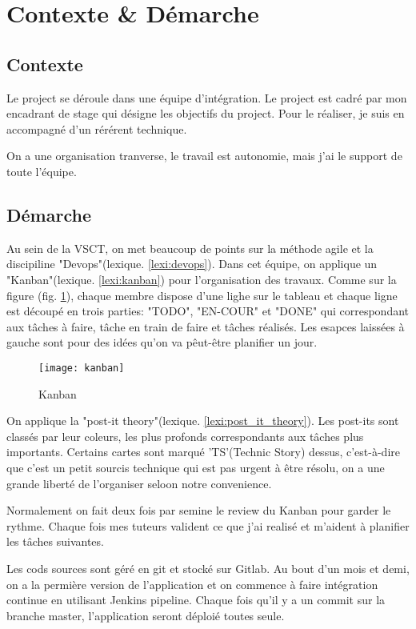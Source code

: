 \section{Contexte \& Démarche}
\subsection{Contexte}
Le project se déroule dans une équipe d'intégration. Le project est cadré par mon encadrant de stage qui désigne les objectifs du project. Pour le réaliser, je suis en accompagné d'un rérérent technique.

On a une organisation tranverse, le travail est autonomie, mais j'ai le support de toute l'équipe.

\subsection{Démarche}
Au sein de la VSCT, on met beaucoup de points sur la méthode agile et la discipiline "Devops"(lexique. \ref{lexi:devops}). Dans cet équipe, on applique un "Kanban"(lexique. \ref{lexi:kanban}) pour l'organisation des travaux.  Comme sur la figure (fig. \ref{fig:kanban}), chaque membre dispose d'une lighe sur le tableau et chaque ligne est découpé en trois parties: "TODO", "EN-COUR" et "DONE" qui correspondant aux tâches à faire, tâche en train de faire et tâches réalisés. Les esapces laissées à gauche sont pour des idées qu'on va pêut-être planifier un jour.

\begin{figure}[ht]
\centering
\texttt{[image: kanban]}
\caption{Kanban}
\label{fig:kanban}
\end{figure}

On applique la "post-it theory"(lexique. \ref{lexi:post_it_theory}). Les post-its sont classés par leur coleurs, les plus profonds correspondants aux tâches plus importants. Certains cartes sont marqué 'TS'(Technic Story) dessus, c'est-à-dire que c'est un petit sourcis technique qui est pas urgent à être résolu, on a une grande liberté de l'organiser seloon notre convenience.

Normalement on fait  deux fois par semine le review du Kanban pour garder le rythme. Chaque fois mes tuteurs valident ce que j'ai realisé et m'aident à planifier les tâches suivantes.

Les cods sources sont géré en git et stocké sur Gitlab. Au bout d'un mois et demi, on a la permière version de l'application et on commence à faire intégration continue en utilisant Jenkins pipeline. Chaque fois qu'il y a un commit sur la branche master, l'application seront déploié toutes seule.

\clearpage
